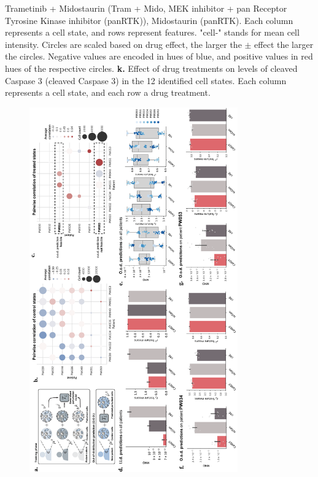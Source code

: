 {Trametinib + Midostaurin (Tram + Mido, MEK inhibitor + pan Receptor Tyrosine Kinase inhibitor (panRTK)), Midostaurin (panRTK). Each column represents a cell state, and rows represent features. "cell-" stands for mean cell intensity. Circles are scaled based on drug effect, the larger the $\pm$ effect the larger the circles. Negative values are encoded in hues of blue, and positive values in red hues of the respective circles. \textbf{k.} Effect of drug treatments on levels of cleaved Caspase 3 (cleaved Caspase 3) in the 12 identified cell states. Each column represents a cell state, and each row a drug treatment.}
\label{fig:4i_analysis_extended}

\newpage
\begin{figure}[H]
     \centering
     \includegraphics[width=0.8\textwidth]{figures/fig_gbm_patients_iid_ood.pdf}
\end{figure}
